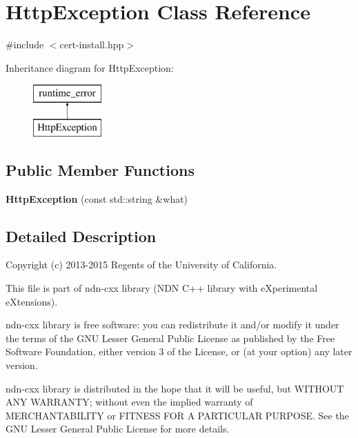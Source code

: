\hypertarget{classHttpException}{}\section{Http\+Exception Class Reference}
\label{classHttpException}


{\ttfamily \#include $<$cert-\/install.\+hpp$>$}

Inheritance diagram for Http\+Exception\+:\begin{figure}[H]
\begin{center}
\leavevmode
\includegraphics[height=2.000000cm]{classHttpException}
\end{center}
\end{figure}
\subsection*{Public Member Functions}
\begin{DoxyCompactItemize}
\item 
{\bfseries Http\+Exception} (const std\+::string \&what)\hypertarget{classHttpException_afc3e357d056d4062dcbf6137d16f9ba6}{}\label{classHttpException_afc3e357d056d4062dcbf6137d16f9ba6}

\end{DoxyCompactItemize}


\subsection{Detailed Description}
Copyright (c) 2013-\/2015 Regents of the University of California.

This file is part of ndn-\/cxx library (N\+DN C++ library with e\+Xperimental e\+Xtensions).

ndn-\/cxx library is free software\+: you can redistribute it and/or modify it under the terms of the G\+NU Lesser General Public License as published by the Free Software Foundation, either version 3 of the License, or (at your option) any later version.

ndn-\/cxx library is distributed in the hope that it will be useful, but W\+I\+T\+H\+O\+UT A\+NY W\+A\+R\+R\+A\+N\+TY; without even the implied warranty of M\+E\+R\+C\+H\+A\+N\+T\+A\+B\+I\+L\+I\+TY or F\+I\+T\+N\+E\+SS F\+OR A P\+A\+R\+T\+I\+C\+U\+L\+AR P\+U\+R\+P\+O\+SE. See the G\+NU Lesser General Public License for more details.


